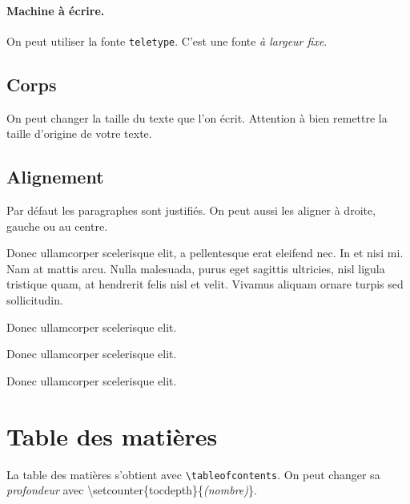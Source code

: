 \documentclass[a4paper, 11pt]{article}
\begin{document}
      \paragraph{Machine à écrire. } On peut utiliser la fonte \texttt{teletype}. {\ttfamily C'est une fonte \emph{à largeur fixe}.}

    \subsection{Corps}

      On peut \large changer la \Large taille du \LARGE texte que l'on \Huge écrit. \normalsize Attention à \small bien remettre \footnotesize la taille \scriptsize d'origine de votre texte. \normalsize

    \subsection{Alignement}

      Par défaut les paragraphes sont justifiés. On peut aussi les aligner à droite, gauche ou au centre.

      Donec ullamcorper scelerisque elit, a pellentesque erat eleifend nec. In et nisi mi. Nam at mattis arcu. Nulla malesuada, purus eget sagittis ultricies, nisl ligula tristique quam, at hendrerit felis nisl et velit. Vivamus aliquam ornare turpis sed sollicitudin.

      \begin{flushleft}
      Donec ullamcorper scelerisque elit.
      \end{flushleft}

      \begin{center}
      Donec ullamcorper scelerisque elit.
      \end{center}

      \begin{flushright}
      Donec ullamcorper scelerisque elit.
      \end{flushright}

  \section{Table des matières}

    La table des matières s'obtient avec \texttt{\textbackslash tableofcontents}. On peut changer sa \emph{profondeur} avec {\ttfamily \textbackslash setcounter\{tocdepth\}\{{\normalfont\itshape (nombre)}\}}.
\end{document}
